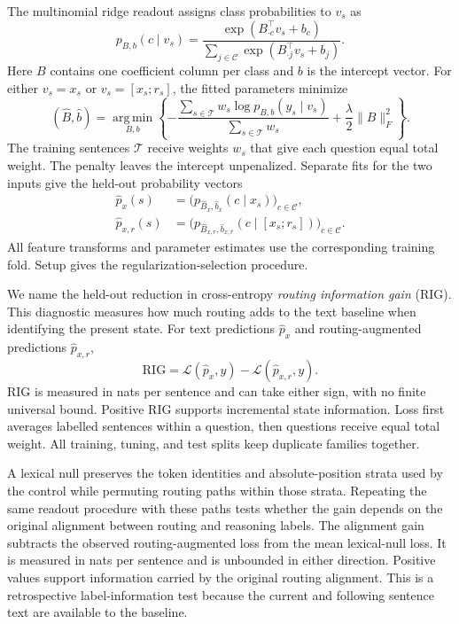 The multinomial ridge readout assigns class probabilities to $v_s$ as
\begin{equation}
 p_{B,b}(c\mid v_s)=
 \frac{\exp(B_{\cdot c}^{\top}v_s+b_c)}
 {\sum_{j\in\mathcal C}\exp(B_{\cdot j}^{\top}v_s+b_j)}.
 \label{eq:readout-map}
\end{equation}
Here $B$ contains one coefficient column per class and $b$ is the intercept vector.
%
For either $v_s=x_s$ or $v_s=[x_s;r_s]$, the fitted parameters minimize
\begin{equation}
 (\widehat B,\widehat b)=\operatorname*{arg\,min}_{B,b}
 \left\{-\frac{\sum_{s\in\mathcal T}w_s\log p_{B,b}(y_s\mid v_s)}
 {\sum_{s\in\mathcal T}w_s}
 +\frac{\lambda}{2}\|B\|_F^2\right\}.
 \label{eq:readout-fit}
\end{equation}
The training sentences $\mathcal T$ receive weights $w_s$ that give each question equal total weight.
%
The penalty leaves the intercept unpenalized.
%
Separate fits for the two inputs give the held-out probability vectors
\begin{equation}
 \begin{aligned}
 \widehat p_x(s)&=
 \bigl(p_{\widehat B_x,\widehat b_x}(c\mid x_s)\bigr)_{c\in\mathcal C},\\
 \widehat p_{x,r}(s)&=
 \bigl(p_{\widehat B_{x,r},\widehat b_{x,r}}(c\mid[x_s;r_s])\bigr)_{c\in\mathcal C}.
 \end{aligned}
 \label{eq:present-predictions}
\end{equation}
All feature transforms and parameter estimates use the corresponding training fold.
%
Setup gives the regularization-selection procedure.
%

We name the held-out reduction in cross-entropy \emph{routing information gain} (RIG).
%
This diagnostic measures how much routing adds to the text baseline when identifying the present state.
%
For text predictions $\widehat p_x$ and routing-augmented predictions $\widehat p_{x,r}$,
\begin{equation}
 \mathrm{RIG}
 =\mathcal L(\widehat p_x,y)-\mathcal L(\widehat p_{x,r},y).
 \label{eq:readout}
\end{equation}
RIG is measured in nats per sentence and can take either sign, with no finite universal bound.
%
Positive RIG supports incremental state information.
%
Loss first averages labelled sentences within a question, then questions receive equal total weight.
%
All training, tuning, and test splits keep duplicate families together.
%

A lexical null preserves the token identities and absolute-position strata used by the control while permuting routing paths within those strata.
%
Repeating the same readout procedure with these paths tests whether the gain depends on the original alignment between routing and reasoning labels.
%
The alignment gain subtracts the observed routing-augmented loss from the mean lexical-null loss.
%
It is measured in nats per sentence and is unbounded in either direction.
%
Positive values support information carried by the original routing alignment.
%
This is a retrospective label-information test because the current and following sentence text are available to the baseline.
%

